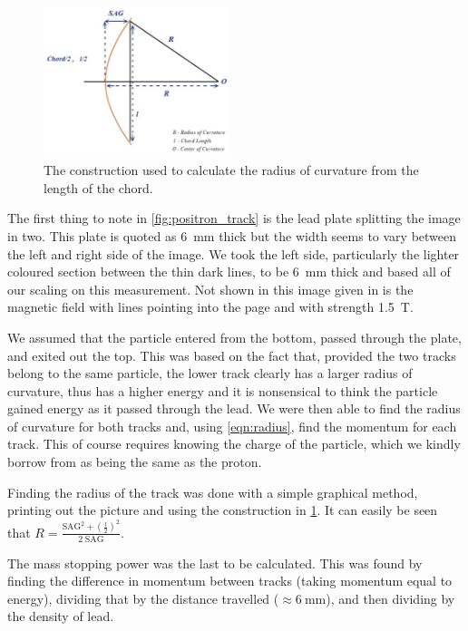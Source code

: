 \documentclass[11pt]{article}
\numberwithin{equation}{section}
\numberwithin{figure}{section}
\numberwithin{table}{section}
\begin{document}
\begin{figure}
    \vspace{-10pt}
    \includegraphics[width=0.48\textwidth]{Plots/radius.png}
    \caption{The construction used to calculate the radius of curvature from the length of the chord.~\cite{radius_calculator}}
    \label{fig:radius}
\end{figure}

The first thing to note in \cref{fig:positron_track} is the lead plate splitting the image in two. This plate is quoted as \SI{6}{\milli\metre} thick but the width seems to vary between the left and right side of the image. We took the left side, particularly the lighter coloured section between the thin dark lines, to be \SI{6}{\milli\metre} thick and based all of our scaling on this measurement. Not shown in this image given in \cite{Pos_Electron} is the magnetic field with lines pointing into the page and with strength \SI{1.5}{\tesla}. 


We assumed that the particle entered from the bottom, passed through the plate, and exited out the top. This was based on the fact that, provided the two tracks belong to the same particle, the lower track clearly has a larger radius of curvature, thus has a higher energy and it is nonsensical to think the particle gained energy as it passed through the lead. We were then able to find the radius of curvature for both tracks and, using \cref{eqn:radius}, find the momentum for each track. This of course requires knowing the charge of the particle, which we kindly borrow from \cite{Pos_Electron} as being the same as the proton. 


Finding the radius of the track was done with a simple graphical method, printing out the picture and using the construction in \cref{fig:radius}. It can easily be seen that $R=\frac{\mathrm{SAG}^2+\left(\frac{l}{2}\right)^2}{2\;\mathrm{SAG}}$. 

The mass stopping power was the last to be calculated. This was found by finding the difference in momentum between tracks (taking momentum equal to energy), dividing that by the distance travelled ($\approx \SI{6}{\milli\metre}$), and then dividing by the density of lead. 
\end{document}
